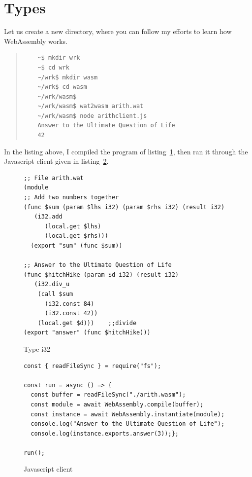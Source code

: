 \documentclass[a4paper,12pt]{book}
\begin{document}
\section{Types}

Let us create a new directory, where you can follow my
efforts to learn how WebAssembly works.

\begin{quote}
  \begin{verbatim}
    ~$ mkdir wrk
    ~$ cd wrk
    ~/wrk$ mkdir wasm
    ~/wrk$ cd wasm
    ~/wrk/wasm$
    ~/wrk/wasm$ wat2wasm arith.wat
    ~/wrk/wasm$ node arithclient.js
    Answer to the Ultimate Question of Life
    42
  \end{verbatim}
\end{quote}
In the listing above, I compiled the program of
listing~\ref{wasm:i32}, then ran it through the
Javascript client given in listing~\ref{wasm:client}.


\begin{figure}[!h]
\begin{verbatim}
;; File arith.wat
(module
;; Add two numbers together
(func $sum (param $lhs i32) (param $rhs i32) (result i32)
   (i32.add
      (local.get $lhs)
      (local.get $rhs)))
  (export "sum" (func $sum))

;; Answer to the Ultimate Question of Life
(func $hitchHike (param $d i32) (result i32)
   (i32.div_u
    (call $sum
      (i32.const 84)
      (i32.const 42))  
    (local.get $d)))    ;;divide
(export "answer" (func $hitchHike)))
\end{verbatim}

\caption{Type i32}
\label{wasm:i32}
\end{figure}


\begin{figure}[!h]
\begin{verbatim}
const { readFileSync } = require("fs");

const run = async () => {
  const buffer = readFileSync("./arith.wasm");
  const module = await WebAssembly.compile(buffer);
  const instance = await WebAssembly.instantiate(module);
  console.log("Answer to the Ultimate Question of Life");
  console.log(instance.exports.answer(3));};

run();
\end{verbatim}

\caption{Javascript client}
\label{wasm:client}
\end{figure}
\end{document}
